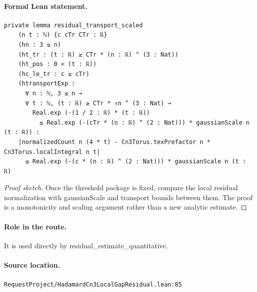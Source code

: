 \medskip
\paragraph{Formal Lean statement.}
\begin{verbatim}
private lemma residual_transport_scaled
    (n t : ℕ) {c cTr CTr : ℝ}
    (hn : 3 ≤ n)
    (ht_tr : (t : ℝ) ≥ CTr * (n : ℝ) ^ (3 : Nat))
    (ht_pos : 0 < (t : ℝ))
    (hc_le_tr : c ≤ cTr)
    (htransportExp :
      ∀ n : ℕ, 3 ≤ n →
      ∀ t : ℕ, (t : ℝ) ≥ CTr * ↑n ^ (3 : Nat) →
        Real.exp (-(1 / 2 : ℝ) * (t : ℝ))
          ≤ Real.exp (-(cTr * (n : ℝ) ^ (2 : Nat))) * gaussianScale n (t : ℝ)) :
    |normalizedCount n (4 * t) - Cn3Torus.texPrefactor n * Cn3Torus.localIntegral n t|
      ≤ Real.exp (-(c * (n : ℝ) ^ (2 : Nat))) * gaussianScale n (t : ℝ)
\end{verbatim}
\begin{proof}[Proof sketch]
Once the threshold package is fixed, compare the local residual normalization with gaussianScale and transport bounds between them. The proof is a monotonicity and scaling argument rather than a new analytic estimate.
\end{proof}
\paragraph{Role in the route.}
It is used directly by residual\_estimate\_quantitative.
\paragraph{Source location.}
\texttt{RequestProject/HadamardCn3LocalGapResidual.lean:85}
\medskip

